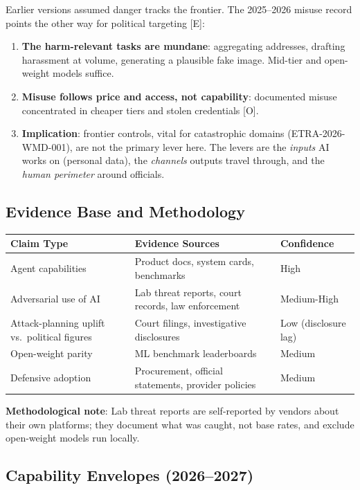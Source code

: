 \documentclass[11pt,letterpaper]{article}
\begin{document}
Earlier versions assumed danger tracks the frontier. The 2025--2026 misuse record points the other way for political targeting [E]:
\begin{enumerate}
  \item \textbf{The harm-relevant tasks are mundane}: aggregating addresses, drafting harassment at volume, generating a plausible fake image. Mid-tier and open-weight models suffice.
  \item \textbf{Misuse follows price and access, not capability}: documented misuse concentrated in cheaper tiers and stolen credentials [O].
  \item \textbf{Implication}: frontier controls, vital for catastrophic domains (ETRA-2026-WMD-001), are not the primary lever here. The levers are the \textit{inputs} AI works on (personal data), the \textit{channels} outputs travel through, and the \textit{human perimeter} around officials.
\end{enumerate}

\subsection{Evidence Base and Methodology}

\begin{center}
\small
\begin{tabular}{L{4cm}L{6.5cm}L{3cm}}
\toprule
\textbf{Claim Type} & \textbf{Evidence Sources} & \textbf{Confidence} \\
\midrule
Agent capabilities & Product docs, system cards, benchmarks & High \\
Adversarial use of AI & Lab threat reports, court records, law enforcement & Medium-High \\
Attack-planning uplift vs.\ political figures & Court filings, investigative disclosures & Low (disclosure lag) \\
Open-weight parity & ML benchmark leaderboards & Medium \\
Defensive adoption & Procurement, official statements, provider policies & Medium \\
\bottomrule
\end{tabular}
\end{center}

\textbf{Methodological note}: Lab threat reports are self-reported by vendors about their own platforms; they document what was caught, not base rates, and exclude open-weight models run locally.

\subsection{Capability Envelopes (2026--2027)}
\end{document}
